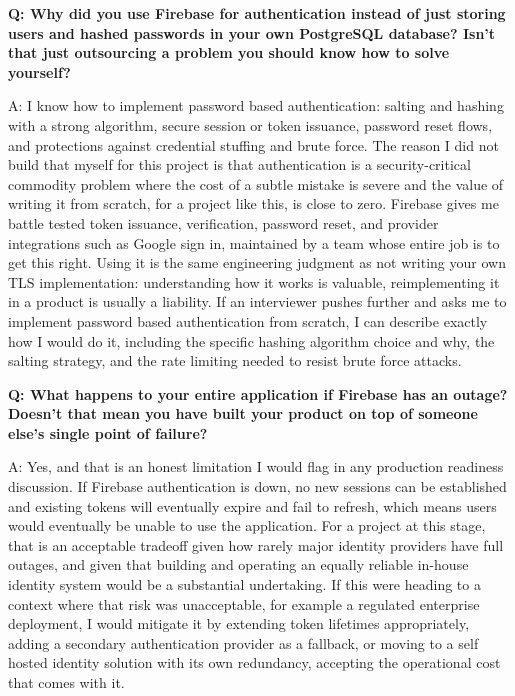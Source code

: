 \documentclass[11pt,a4paper]{report}
\begin{document}
\begin{qabox}
\textbf{Q: Why did you use Firebase for authentication instead of just storing users and hashed passwords in your own PostgreSQL database? Isn't that just outsourcing a problem you should know how to solve yourself?}

A: I know how to implement password based authentication: salting and hashing with a strong algorithm, secure session or token issuance, password reset flows, and protections against credential stuffing and brute force. The reason I did not build that myself for this project is that authentication is a security-critical commodity problem where the cost of a subtle mistake is severe and the value of writing it from scratch, for a project like this, is close to zero. Firebase gives me battle tested token issuance, verification, password reset, and provider integrations such as Google sign in, maintained by a team whose entire job is to get this right. Using it is the same engineering judgment as not writing your own TLS implementation: understanding how it works is valuable, reimplementing it in a product is usually a liability. If an interviewer pushes further and asks me to implement password based authentication from scratch, I can describe exactly how I would do it, including the specific hashing algorithm choice and why, the salting strategy, and the rate limiting needed to resist brute force attacks.
\end{qabox}

\begin{qabox}
\textbf{Q: What happens to your entire application if Firebase has an outage? Doesn't that mean you have built your product on top of someone else's single point of failure?}

A: Yes, and that is an honest limitation I would flag in any production readiness discussion. If Firebase authentication is down, no new sessions can be established and existing tokens will eventually expire and fail to refresh, which means users would eventually be unable to use the application. For a project at this stage, that is an acceptable tradeoff given how rarely major identity providers have full outages, and given that building and operating an equally reliable in-house identity system would be a substantial undertaking. If this were heading to a context where that risk was unacceptable, for example a regulated enterprise deployment, I would mitigate it by extending token lifetimes appropriately, adding a secondary authentication provider as a fallback, or moving to a self hosted identity solution with its own redundancy, accepting the operational cost that comes with it.
\end{qabox}
\end{document}
